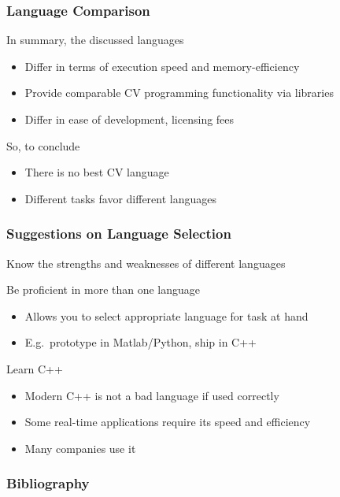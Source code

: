 \documentclass[xetex,professionalfont]{beamer}
\begin{document}

\begin{frame}
\frametitle{Language Comparison}

In summary, the discussed languages
\begin{itemize}
	\item Differ in terms of execution speed and memory-efficiency
	\item Provide comparable CV programming functionality via libraries
	\item Differ in ease of development, licensing fees
\end{itemize}

\medskip
So, to conclude
\begin{itemize}
	\item There is no best CV language
	\item Different tasks favor different languages
\end{itemize}

\end{frame}


\begin{frame}
\frametitle{Suggestions on Language Selection}

Know the strengths and weaknesses of different languages

\medskip
Be proficient in more than one language
\begin{itemize}
	\item Allows you to select appropriate language for task at hand
	\item E.g.\ prototype in Matlab/Python, ship in C++
\end{itemize}

\medskip
Learn C++
\begin{itemize}
	\item Modern C++ is not a bad language if used correctly
	\item Some real-time applications require its speed and efficiency
	\item Many companies use it
\end{itemize}

\end{frame}


\begin{frame}
\frametitle{Bibliography}

\printbibliography

\end{frame}
\end{document}
